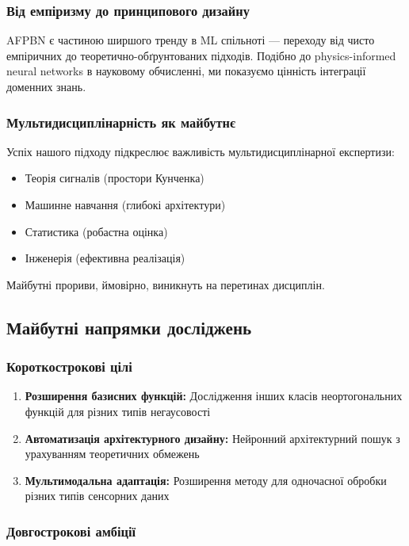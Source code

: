 \documentclass[12pt,a4paper]{article}
\begin{document}
\subsubsection{Від емпіризму до принципового дизайну}

AFPBN є частиною ширшого тренду в ML спільноті --- переходу від чисто емпіричних до теоретично-обґрунтованих підходів. Подібно до physics-informed neural networks в науковому обчисленні, ми показуємо цінність інтеграції доменних знань.

\subsubsection{Мультидисциплінарність як майбутнє}

Успіх нашого підходу підкреслює важливість мультидисциплінарної експертизи:
\begin{itemize}
	\item Теорія сигналів (простори Кунченка)
	\item Машинне навчання (глибокі архітектури)
	\item Статистика (робастна оцінка)
	\item Інженерія (ефективна реалізація)
\end{itemize}

Майбутні прориви, ймовірно, виникнуть на перетинах дисциплін.

\subsection{Майбутні напрямки досліджень}

\subsubsection{Короткострокові цілі}

\begin{enumerate}
	\item \textbf{Розширення базисних функцій:} Дослідження інших класів неортогональних функцій для різних типів негаусовості
	\item \textbf{Автоматизація архітектурного дизайну:} Нейронний архітектурний пошук з урахуванням теоретичних обмежень
	\item \textbf{Мультимодальна адаптація:} Розширення методу для одночасної обробки різних типів сенсорних даних
\end{enumerate}

\subsubsection{Довгострокові амбіції}
\end{document}
